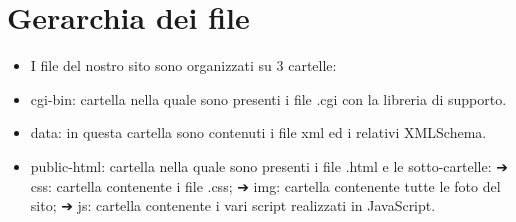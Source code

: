\documentclass[12pt]{article}
\begin{document}
			\section{Gerarchia dei file}
			\begin{itemize}
				\item I file del nostro sito sono organizzati su 3 cartelle:
				\item cgi-bin: cartella nella quale sono presenti i file .cgi con la libreria di supporto.
				\item data: in questa cartella sono contenuti i file xml ed i relativi XMLSchema.
				\item public-html: cartella nella quale sono presenti i file .html e le sotto-cartelle:
				➔ css: cartella contenente i file .css;
				➔ img: cartella contenente tutte le foto del sito;
				➔ js: cartella contenente i vari script realizzati in JavaScript.
			\end{itemize}
\end{document}
